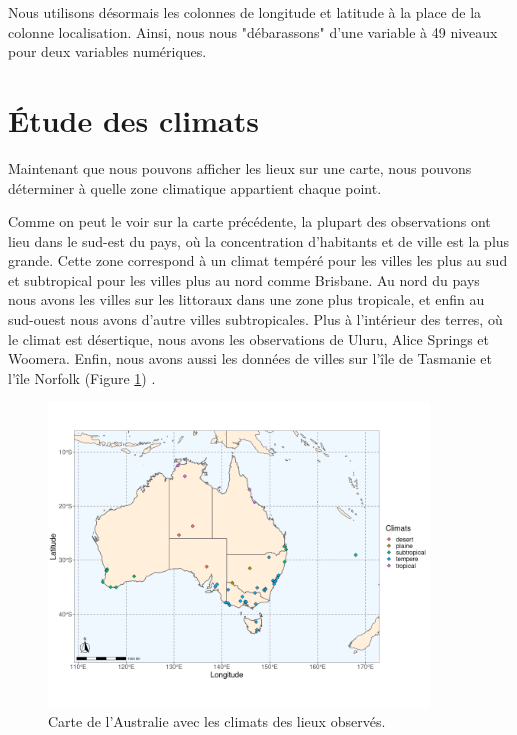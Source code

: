 \documentclass{article}
\begin{document}
Nous utilisons désormais les colonnes de longitude et latitude à la place de la colonne localisation. Ainsi, nous nous "débarassons" d'une variable à 49 niveaux pour deux variables numériques.  

\section{Étude des climats}

Maintenant que nous pouvons afficher les lieux sur une carte, nous pouvons déterminer à quelle zone climatique appartient chaque point.

Comme on peut le voir sur la carte précédente, la plupart des observations ont lieu dans le sud-est du pays, où la concentration d'habitants et de ville est la plus grande. Cette zone correspond à un climat tempéré pour les villes les plus au sud et subtropical pour les villes plus au nord comme Brisbane. Au nord du pays nous avons les villes sur les littoraux dans une zone plus tropicale, et enfin au sud-ouest nous avons d'autre villes subtropicales. Plus à l'intérieur des terres, où le climat est désertique, nous avons les observations de Uluru, Alice Springs et Woomera. Enfin, nous avons aussi les données de villes sur l'île de Tasmanie et l'île Norfolk (Figure \ref{fig:carte_climats}) \cite{frwiki:190163125}. 

\begin{figure}[htp]
    \centering
    \includegraphics[width=0.9\textwidth]{Images/Cartographie/Australia_climates.png}
    \caption{Carte de l'Australie avec les climats des lieux observés.}
    \label{fig:carte_climats}
\end{figure}
\end{document}
